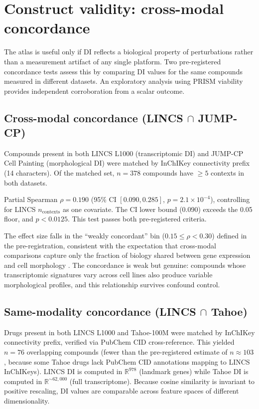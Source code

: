 \documentclass[11pt]{article}
\begin{document}
\section{Construct validity: cross-modal concordance}
\label{sec:concordance}

The atlas is useful only if DI reflects a biological property of
perturbations rather than a measurement artifact of any single platform.
Two pre-registered concordance tests assess this by comparing
DI values for the same compounds measured in different datasets.  An
exploratory analysis using PRISM viability provides independent
corroboration from a scalar outcome.

\subsection{Cross-modal concordance (LINCS \texorpdfstring{$\cap$}{∩} JUMP-CP)}

Compounds present in both LINCS L1000 (transcriptomic DI) and JUMP-CP
Cell Painting (morphological DI) were matched by InChIKey connectivity
prefix (14 characters).  Of the matched set, $n = 378$ compounds have
$\geq 5$ contexts in both datasets.

Partial Spearman $\rho = 0.190$ (95\% CI $[0.090, 0.285]$,
$p = 2.1 \times 10^{-4}$), controlling for LINCS $n_{\mathrm{contexts}}$
as one covariate.  The CI lower bound (0.090) exceeds the 0.05 floor,
and $p < 0.0125$.  This test passes both pre-registered criteria.

The effect size falls in the ``weakly concordant'' bin
($0.15 \leq \rho < 0.30$) defined in the pre-registration, consistent
with the expectation that cross-modal comparisons capture only the
fraction of biology shared between gene expression and cell morphology
\citep{haghighi2022crossmodal}.  The concordance is weak but genuine:
compounds whose transcriptomic signatures vary across cell lines also
produce variable morphological profiles, and this relationship survives
confound control.

\subsection{Same-modality concordance (LINCS \texorpdfstring{$\cap$}{∩} Tahoe)}

Drugs present in both LINCS L1000 and Tahoe-100M were matched by
InChIKey connectivity prefix, verified via PubChem CID cross-reference.
This yielded $n = 76$ overlapping compounds (fewer than the
pre-registered estimate of $n \approx 103$, because some Tahoe drugs
lack PubChem CID annotations mapping to LINCS InChIKeys).  LINCS DI is
computed in $\mathbb{R}^{978}$ (landmark genes) while Tahoe DI is
computed in $\mathbb{R}^{\sim 62{,}000}$ (full transcriptome).  Because
cosine similarity is invariant to positive rescaling, DI values are
comparable across feature spaces of different dimensionality.
\end{document}
